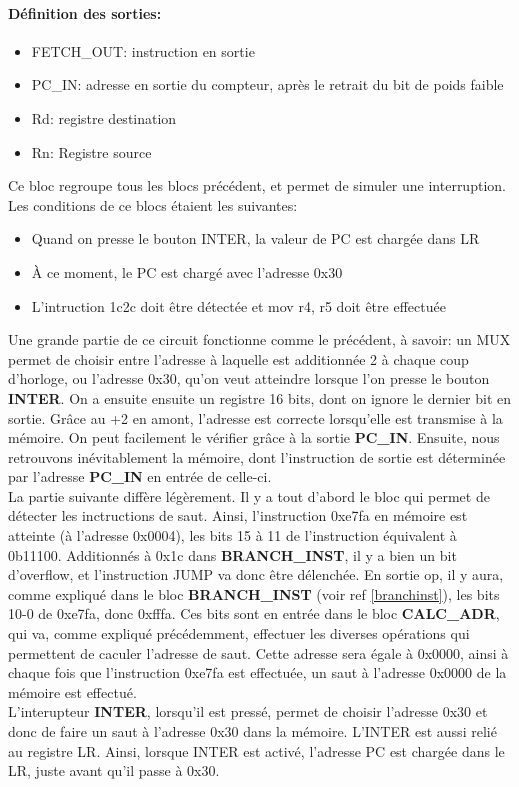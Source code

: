 \documentclass[a4paper]{article} %
\begin{document}
\paragraph{Définition des sorties:}
\begin{itemize}
    \item FETCH\_OUT: instruction en sortie
    \item PC\_IN: adresse en sortie du compteur, après le retrait du bit de poids faible
    \item Rd: registre destination
    \item Rn: Registre source
\end{itemize}
\medskip
Ce bloc regroupe tous les blocs précédent, et permet de simuler une interruption. Les conditions de ce blocs étaient les suivantes:
\begin{itemize}
   \item Quand on presse le bouton INTER, la valeur de PC est chargée dans LR
   \item À ce moment, le PC est chargé avec l'adresse 0x30
   \item L'intruction 1c2c doit être détectée et mov r4, r5 doit être effectuée
\end{itemize}
\medskip
Une grande partie de ce circuit fonctionne comme le précédent, à savoir: un MUX permet de choisir entre l'adresse à laquelle est additionnée 2 à chaque coup d'horloge, ou l'adresse 0x30, qu'on veut atteindre lorsque l'on presse le bouton \textbf{INTER}. On a ensuite ensuite un registre 16 bits, dont on ignore le dernier bit en sortie. Grâce au +2 en amont, l'adresse est correcte lorsqu'elle est transmise à la mémoire. On peut facilement le vérifier grâce à la sortie \textbf{PC\_IN}. Ensuite, nous retrouvons inévitablement la mémoire, dont l'instruction de sortie est déterminée par l'adresse \textbf{PC\_IN} en entrée de celle-ci.\medskip \\

La partie suivante diffère légèrement. Il y a tout d'abord le bloc  qui permet de détecter les inctructions de saut. Ainsi, l'instruction 0xe7fa en mémoire est atteinte (à l'adresse 0x0004), les bits 15 à 11 de l'instruction équivalent à 0b11100. Additionnés à 0x1c dans \textbf{BRANCH\_INST}, il y a bien un bit d'overflow, et l'instruction JUMP va donc être délenchée. En sortie op, il y aura, comme expliqué dans le bloc \textbf{BRANCH\_INST} (voir ref \ref{branchinst}), les bits 10-0 de 0xe7fa, donc 0xfffa. Ces bits sont en entrée dans le bloc \textbf{CALC\_ADR}, qui va, comme expliqué précédemment, effectuer les diverses opérations qui permettent de caculer l'adresse de saut. Cette adresse sera égale à 0x0000, ainsi à chaque fois que l'instruction 0xe7fa est effectuée, un saut à l'adresse 0x0000 de la mémoire est effectué.\\
L'interupteur \textbf{INTER}, lorsqu'il est pressé, permet de choisir l'adresse 0x30 et donc de faire un saut à l'adresse 0x30 dans la mémoire. L'INTER est aussi relié au registre LR. Ainsi, lorsque INTER est activé, l'adresse PC est chargée dans le LR, juste avant qu'il passe à 0x30.\medskip \\
\end{document}
